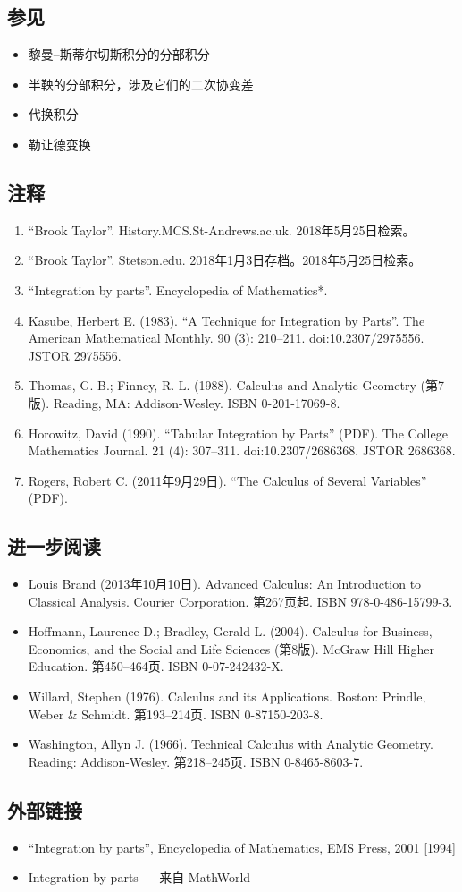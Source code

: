 \subsection{参见}
\begin{itemize}
\item 黎曼–斯蒂尔切斯积分的分部积分
\item 半鞅的分部积分，涉及它们的二次协变差
\item 代换积分
\item 勒让德变换
\end{itemize}
\subsection{注释}
\begin{enumerate}
\item “Brook Taylor”. History.MCS.St-Andrews.ac.uk. 2018年5月25日检索。
\item “Brook Taylor”. Stetson.edu. 2018年1月3日存档。2018年5月25日检索。
\item “Integration by parts”. Encyclopedia of Mathematics*.
\item Kasube, Herbert E. (1983). “A Technique for Integration by Parts”. The American Mathematical Monthly. 90 (3): 210–211. doi:10.2307/2975556. JSTOR 2975556.
\item Thomas, G. B.; Finney, R. L. (1988). Calculus and Analytic Geometry (第7版). Reading, MA: Addison-Wesley. ISBN 0-201-17069-8.
\item Horowitz, David (1990). “Tabular Integration by Parts” (PDF). The College Mathematics Journal. 21 (4): 307–311. doi:10.2307/2686368. JSTOR 2686368.
\item Rogers, Robert C. (2011年9月29日). “The Calculus of Several Variables” (PDF).
\end{enumerate}
\subsection{进一步阅读}
\begin{itemize}
\item Louis Brand (2013年10月10日). Advanced Calculus: An Introduction to Classical Analysis. Courier Corporation. 第267页起. ISBN 978-0-486-15799-3.
\item Hoffmann, Laurence D.; Bradley, Gerald L. (2004). Calculus for Business, Economics, and the Social and Life Sciences (第8版). McGraw Hill Higher Education. 第450–464页. ISBN 0-07-242432-X.
\item Willard, Stephen (1976). Calculus and its Applications. Boston: Prindle, Weber & Schmidt. 第193–214页. ISBN 0-87150-203-8.
\item Washington, Allyn J. (1966). Technical Calculus with Analytic Geometry. Reading: Addison-Wesley. 第218–245页. ISBN 0-8465-8603-7.
\end{itemize}
\subsection{外部链接}
\begin{itemize}
\item “Integration by parts”, Encyclopedia of Mathematics, EMS Press, 2001 [1994]
\item Integration by parts — 来自 MathWorld
\end{itemize}